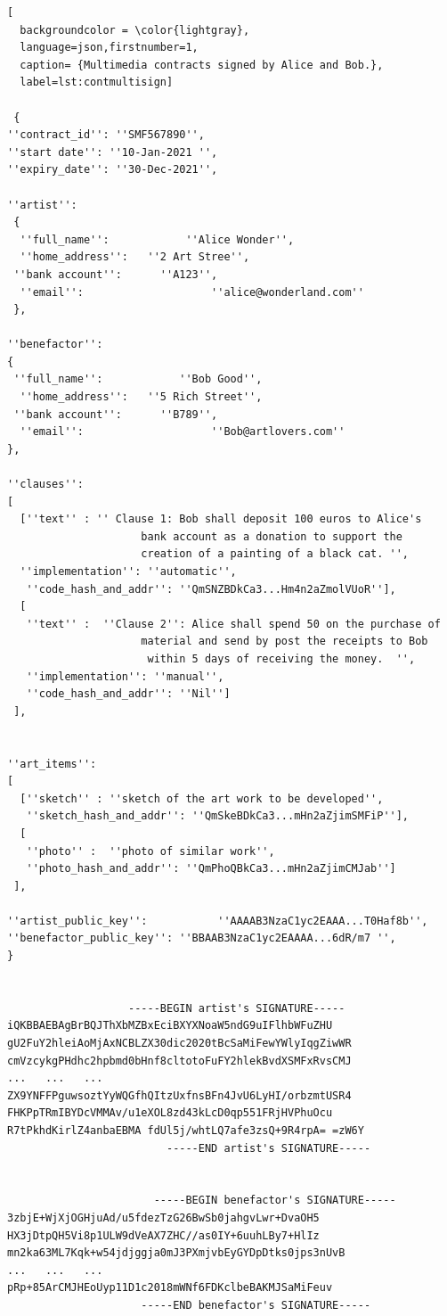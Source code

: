 \documentclass[12pt]{report} %
\begin{document}
\begin{lstlisting}[
  backgroundcolor = \color{lightgray},
  language=json,firstnumber=1,
  caption= {Multimedia contracts signed by Alice and Bob.},
  label=lst:contmultisign]
  
 {
''contract_id'': ''SMF567890'',
''start date'': ''10-Jan-2021 '',
''expiry_date'': ''30-Dec-2021'',

''artist'':
 {
  ''full_name'':            ''Alice Wonder'',
  ''home_address'':   ''2 Art Stree'',
 ''bank account'':      ''A123'',
  ''email'':                    ''alice@wonderland.com''
 },
 
''benefactor'':
{
 ''full_name'':            ''Bob Good'',
  ''home_address'':   ''5 Rich Street'',
 ''bank account'':      ''B789'',
  ''email'':                    ''Bob@artlovers.com''
},
 
''clauses'':
[
  [''text'' : '' Clause 1: Bob shall deposit 100 euros to Alice's 
                     bank account as a donation to support the 
                     creation of a painting of a black cat. '',
  ''implementation'': ''automatic'',
   ''code_hash_and_addr'': ''QmSNZBDkCa3...Hm4n2aZmolVUoR''],
  [
   ''text'' :  ''Clause 2'': Alice shall spend 50 on the purchase of 
                     material and send by post the receipts to Bob 
                      within 5 days of receiving the money.  '',
   ''implementation'': ''manual'',
   ''code_hash_and_addr'': ''Nil'']
 ],


''art_items'':
[
  [''sketch'' : ''sketch of the art work to be developed'',
   ''sketch_hash_and_addr'': ''QmSkeBDkCa3...mHn2aZjimSMFiP''],
  [
   ''photo'' :  ''photo of similar work'',
   ''photo_hash_and_addr'': ''QmPhoQBkCa3...mHn2aZjimCMJab'']
 ],

''artist_public_key'':           ''AAAAB3NzaC1yc2EAAA...T0Haf8b'',
''benefactor_public_key'': ''BBAAB3NzaC1yc2EAAAA...6dR/m7 '',
}


                   -----BEGIN artist's SIGNATURE-----
iQKBBAEBAgBrBQJThXbMZBxEciBXYXNoaW5ndG9uIFlhbWFuZHU
gU2FuY2hleiAoMjAxNCBLZX30dic2020tBcSaMiFewYWlyIqgZiwWR
cmVzcykgPHdhc2hpbmd0bHnf8cltotoFuFY2hlekBvdXSMFxRvsCMJ
...   ...   ...
ZX9YNFFPguwsoztYyWQGfhQItzUxfnsBFn4JvU6LyHI/orbzmtUSR4
FHKPpTRmIBYDcVMMAv/u1eXOL8zd43kLcD0qp551FRjHVPhuOcu
R7tPkhdKirlZ4anbaEBMA fdUl5j/whtLQ7afe3zsQ+9R4rpA= =zW6Y
                         -----END artist's SIGNATURE-----


                       -----BEGIN benefactor's SIGNATURE-----
3zbjE+WjXjOGHjuAd/u5fdezTzG26BwSb0jahgvLwr+DvaOH5
HX3jDtpQH5Vi8p1ULW9dVeAX7ZHC//as0IY+6uuhLBy7+HlIz
mn2ka63ML7Kqk+w54jdjggja0mJ3PXmjvbEyGYDpDtks0jps3nUvB
...   ...   ...
pRp+85ArCMJHEoUyp11D1c2018mWNf6FDKclbeBAKMJSaMiFeuv
                     -----END benefactor's SIGNATURE-----

\end{lstlisting}
\end{document}
